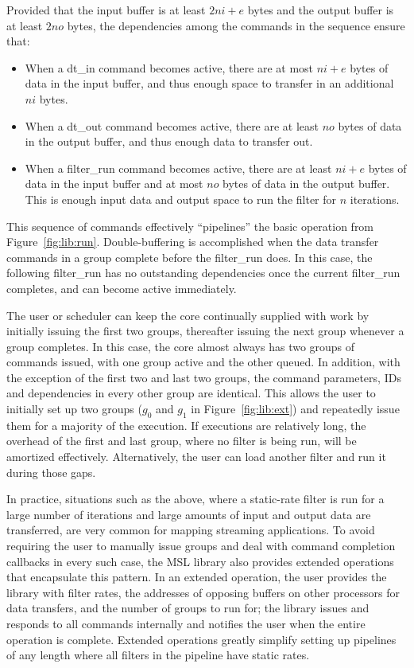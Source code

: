 Provided that the input buffer is at least $2ni+e$ bytes and the output buffer is at least $2no$ bytes, the dependencies among the commands in the sequence ensure that:
\begin{itemize}
\item When a \textsf{dt\_in} command becomes active, there are at most $ni+e$ bytes of data in the input buffer, and thus enough space to transfer in an additional $ni$ bytes.
\item When a \textsf{dt\_out} command becomes active, there are at least $no$ bytes of data in the output buffer, and thus enough data to transfer out.
\item When a \textsf{filter\_run} command becomes active, there are at least $ni+e$ bytes of data in the input buffer and at most $no$ bytes of data in the output buffer. This is enough input data and output space to run the filter for $n$ iterations.
\end{itemize}

This sequence of commands effectively ``pipelines'' the basic operation from Figure~\ref{fig:lib:run}. Double-buffering is accomplished when the data transfer commands in a group complete before the \textsf{filter\_run} does. In this case, the following \textsf{filter\_run} has no outstanding dependencies once the current \textsf{filter\_run} completes, and can become active immediately.

The user or scheduler can keep the core continually supplied with work
by initially issuing the first two groups, thereafter issuing the next
group whenever a group completes. In this case, the core almost always
has two groups of commands issued, with one group active and the other
queued. In addition, with the exception of the first two and last two
groups, the command parameters, IDs and dependencies in every other
group are identical. This allows the user to initially set up two
groups ($g_0$ and $g_1$ in Figure~\ref{fig:lib:ext}) and repeatedly
issue them for a majority of the execution. If executions are
relatively long, the overhead of the first and last group, where no
filter is being run, will be amortized effectively. Alternatively, the
user can load another filter and run it during those gaps.

In practice, situations such as the above, where a static-rate filter
is run for a large number of iterations and large amounts of input and
output data are transferred, are very common for mapping streaming applications. To
avoid requiring the user to manually issue groups and deal with
command completion callbacks in every such case, the MSL library also
provides extended operations that encapsulate this pattern. In an
extended operation, the user provides the library with filter rates,
the addresses of opposing buffers on other processors for data
transfers, and the number of groups to run for; the library issues and
responds to all commands internally and notifies the user when the
entire operation is complete.
Extended operations greatly simplify setting up pipelines
of any length where all filters in the pipeline have static rates.

